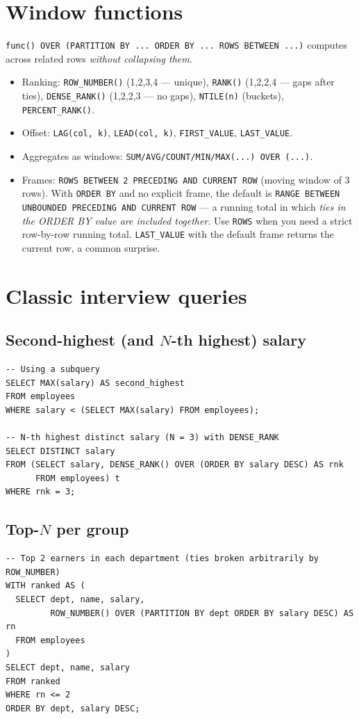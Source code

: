 \section{Window functions}
\texttt{func() OVER (PARTITION BY ... ORDER BY ... ROWS BETWEEN ...)} computes across related rows \emph{without collapsing them}.
\begin{itemize}
  \item Ranking: \texttt{ROW\_NUMBER()} (1,2,3,4 --- unique), \texttt{RANK()} (1,2,2,4 --- gaps after ties), \texttt{DENSE\_RANK()} (1,2,2,3 --- no gaps), \texttt{NTILE(n)} (buckets), \texttt{PERCENT\_RANK()}.
  \item Offset: \texttt{LAG(col, k)}, \texttt{LEAD(col, k)}, \texttt{FIRST\_VALUE}, \texttt{LAST\_VALUE}.
  \item Aggregates as windows: \texttt{SUM/AVG/COUNT/MIN/MAX(...) OVER (...)}.
  \item Frames: \texttt{ROWS BETWEEN 2 PRECEDING AND CURRENT ROW} (moving window of 3 rows). With \texttt{ORDER BY} and no explicit frame, the default is \texttt{RANGE BETWEEN UNBOUNDED PRECEDING AND CURRENT ROW} --- a running total in which \emph{ties in the ORDER BY value are included together}. Use \texttt{ROWS} when you need a strict row-by-row running total. \texttt{LAST\_VALUE} with the default frame returns the current row, a common surprise.
\end{itemize}

\section{Classic interview queries}

\subsection{Second-highest (and \texorpdfstring{$N$}{N}-th highest) salary}
\begin{lstlisting}[style=sql]
-- Using a subquery
SELECT MAX(salary) AS second_highest
FROM employees
WHERE salary < (SELECT MAX(salary) FROM employees);

-- N-th highest distinct salary (N = 3) with DENSE_RANK
SELECT DISTINCT salary
FROM (SELECT salary, DENSE_RANK() OVER (ORDER BY salary DESC) AS rnk
      FROM employees) t
WHERE rnk = 3;
\end{lstlisting}

\subsection{Top-\texorpdfstring{$N$}{N} per group}
\begin{lstlisting}[style=sql]
-- Top 2 earners in each department (ties broken arbitrarily by ROW_NUMBER)
WITH ranked AS (
  SELECT dept, name, salary,
         ROW_NUMBER() OVER (PARTITION BY dept ORDER BY salary DESC) AS rn
  FROM employees
)
SELECT dept, name, salary
FROM ranked
WHERE rn <= 2
ORDER BY dept, salary DESC;
\end{lstlisting}

